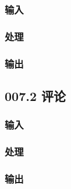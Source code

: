     \subsubsection{输入}
    \subsubsection{处理}
    \subsubsection{输出}

  \subsection{007.2 评论}
    \subsubsection{输入}
    \subsubsection{处理}
    \subsubsection{输出}
